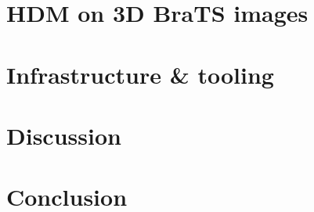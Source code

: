 \chapter{HDM on 3D BraTS images}


\chapter{Infrastructure \& tooling}


\chapter{Discussion}


\chapter{Conclusion}

